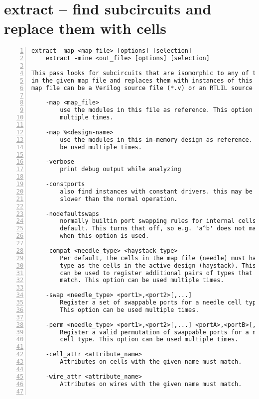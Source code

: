 \section{extract -- find subcircuits and replace them with cells}
\label{cmd:extract}
\begin{lstlisting}[numbers=left,frame=single]
    extract -map <map_file> [options] [selection]
    extract -mine <out_file> [options] [selection]

This pass looks for subcircuits that are isomorphic to any of the modules
in the given map file and replaces them with instances of this modules. The
map file can be a Verilog source file (*.v) or an RTLIL source file (*.il).

    -map <map_file>
        use the modules in this file as reference. This option can be used
        multiple times.

    -map %<design-name>
        use the modules in this in-memory design as reference. This option can
        be used multiple times.

    -verbose
        print debug output while analyzing

    -constports
        also find instances with constant drivers. this may be much
        slower than the normal operation.

    -nodefaultswaps
        normally builtin port swapping rules for internal cells are used per
        default. This turns that off, so e.g. 'a^b' does not match 'b^a'
        when this option is used.

    -compat <needle_type> <haystack_type>
        Per default, the cells in the map file (needle) must have the
        type as the cells in the active design (haystack). This option
        can be used to register additional pairs of types that should
        match. This option can be used multiple times.

    -swap <needle_type> <port1>,<port2>[,...]
        Register a set of swappable ports for a needle cell type.
        This option can be used multiple times.

    -perm <needle_type> <port1>,<port2>[,...] <portA>,<portB>[,...]
        Register a valid permutation of swappable ports for a needle
        cell type. This option can be used multiple times.

    -cell_attr <attribute_name>
        Attributes on cells with the given name must match.

    -wire_attr <attribute_name>
        Attributes on wires with the given name must match.


\end{lstlisting}
